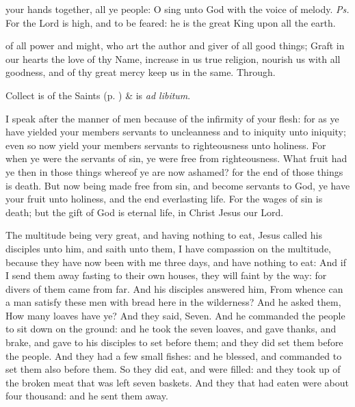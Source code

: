\introit
{} your hands together, all ye people: O sing unto God with the voice of melody. \textit{Ps.} For the Lord is high, and to be feared: he is the great King upon all the earth.

\collect
{} of all power and might, who art the author and giver of all good things; Graft in our hearts the love of thy Name, increase in us true religion, nourish us with all goodness, and of thy great mercy keep us in the same. Through.

\begin{rubric}
     Collect is of the Saints (p. \pageref{SPSaints}) \&  is \emph{ad libitum}.
\end{rubric}

 I speak after the manner of men because of the infirmity of your flesh: for as ye have yielded your members servants to uncleanness and to iniquity unto iniquity; even so now yield your members servants to righteousness unto holiness. For when ye were the servants of sin, ye were free from righteousness. What fruit had ye then in those things whereof ye are now ashamed? for the end of those things is death. But now being made free from sin, and become servants to God, ye have your fruit unto holiness, and the end everlasting life. For the wages of sin is death; but the gift of God is eternal life, in Christ Jesus our Lord.


 The multitude being very great, and having nothing to eat, Jesus called his disciples unto him, and saith unto them, I have compassion on the multitude, because they have now been with me three days, and have nothing to eat: And if I send them away fasting to their own houses, they will faint by the way: for divers of them came from far. And his disciples answered him, From whence can a man satisfy these men with bread here in the wilderness? And he asked them, How many loaves have ye? And they said, Seven. And he commanded the people to sit down on the ground: and he took the seven loaves, and gave thanks, and brake, and gave to his disciples to set before them; and they did set them before the people. And they had a few small fishes: and he blessed, and commanded to set them also before them. So they did eat, and were filled: and they took up of the broken meat that was left seven baskets. And they that had eaten were about four thousand: and he sent them away.

